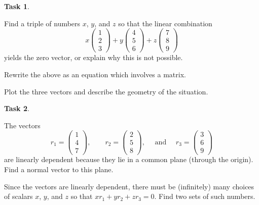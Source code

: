 \documentclass[10pt,]{book}
\theoremstyle{plain}
\theoremstyle{definition}
\numberwithin{equation}{section}
\newtheorem{task}{Task}[chapter]
\begin{document}
\begin{task}
\label{task-27}

          Find a triple of numbers \(x\), \(y\), and \(z\) so that the
          linear combination\[
            x \begin{pmatrix} 1 \\ 2 \\ 3 \end{pmatrix} +
            y \begin{pmatrix} 4 \\ 5\\ 6 \end{pmatrix} +
            z \begin{pmatrix} 7 \\ 8 \\ 9 \end{pmatrix}
          \]
          yields the zero vector, or explain why this is not possible.
\par

          Rewrite the above as an equation which involves a matrix.
\par

          Plot the three vectors and describe the geometry of the situation.
\end{task}
\begin{task}
\label{task-28}

          The vectors\[
            r_1 = \begin{pmatrix} 1 \\ 4 \\ 7 \end{pmatrix}, \qquad
            r_2 = \begin{pmatrix} 2 \\ 5 \\ 8 \end{pmatrix}, \quad \text{ and } \quad
            r_3 = \begin{pmatrix} 3 \\ 6 \\ 9 \end{pmatrix}
          \]
          are linearly dependent because they lie in a common plane (through
          the origin). Find a normal vector to this plane.
\par

          Since the vectors are linearly dependent, there must be (infinitely)
          many choices of scalars \(x\), \(y\), and \(z\) so that
          \(x r_1 + y r_2 + z r_3 = 0\). Find two sets of such numbers.
\end{task}
\end{document}
